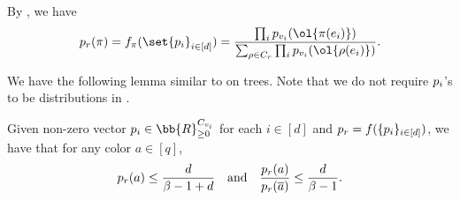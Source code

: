 By , we have
\begin{equation}\label{eq:tree-recursion-short}
    \*p_r(\pi)=f_\pi(\set{\*{p}_i}_{i\in [d]})=
    \frac{\prod_i \*p_{v_i}(\ol{\pi(e_i)})}
    {\sum_{\rho \in C_r} \prod_i \*p_{v_i}(\ol{\rho(e_i)})}.
\end{equation}

We have the following lemma similar to 
on trees. Note that we do not require $\*p_i$'s to be distributions in .
\begin{lemma}\label{lem:marginal_bound_1}
     Given non-zero vector $\*p_i\in \bb{R}_{\geq 0}^{C_{v_i}}$ for each $i\in [d]$ and $\*p_r = f(\{\*p_i\}_{i\in[d]})$, we have that for any color $a \in [q]$,
    \[
        \*p_r(a) \leq \frac{d}{\beta - 1 + d} \quad\mbox{and}\quad  \frac{\*p_r(a)}{\*p_r(\overline{a})} \leq \frac{d}{\beta - 1}.
    \]
    \end{lemma}
